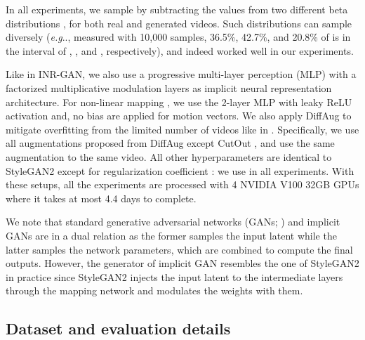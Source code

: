 \documentclass{article} \usepackage{iclr2022_conference,times}
\makeatletter
\DeclareRobustCommand\onedot{\futurelet\@let@token\@onedot}
\def\@onedot{\ifx\@let@token.\else.\null\fi\xspace}
\def\eg{\emph{e.g}\onedot} \def\Eg{\emph{E.g}\onedot}
\makeatother
\begin{document}
In all experiments, we sample  by subtracting the values from  two different beta distributions ,  for both real and generated videos. Such distributions can sample  diversely (\eg, measured with 10,000 samples, 36.5\%, 42.7\%, and 20.8\% of  is in the interval of , , and , respectively), and indeed worked well in our experiments.


Like in INR-GAN, we also use a progressive multi-layer perception (MLP) with a factorized multiplicative modulation layers as implicit neural representation architecture.  
For non-linear mapping , we use the 2-layer MLP with leaky ReLU activation and, no bias are applied for motion vectors. We also apply DiffAug \citep{zhao2020differentiable} to mitigate overfitting from the limited number of videos like in \citet{tian2021good}. Specifically, we use all augmentations proposed from DiffAug except CutOut \citep{devries2017improved}, and use the same augmentation to the same video. All other hyperparameters are identical to StyleGAN2 except for  regularization coefficient : we use  in all experiments. With these setups, all the experiments are processed with 4 NVIDIA V100 32GB GPUs where it takes at most 4.4 days to complete.

We note that standard generative adversarial networks (GANs; \citet{goodfellow2014generative}) and implicit GANs are in a dual relation as the former samples the input latent while the latter samples the network parameters, which are combined to compute the final outputs. However, the generator of implicit GAN resembles the one of StyleGAN2 in practice since StyleGAN2 injects the input latent to the intermediate layers through the mapping network and modulates the weights with them.

\subsection{Dataset and evaluation details}
\label{appen:details-eval}
\end{document}
